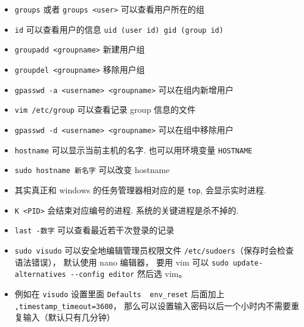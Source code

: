 \begin{itemize}
\item \verb`groups` 或者 \verb`groups <user>` 可以查看用户所在的组
\item \verb`id` 可以查看用户的信息 \verb`uid (user id) gid (group id)`
\item \verb`groupadd <groupname>` 新建用户组
\item \verb`groupdel <groupname>` 移除用户组
\item \verb`gpasswd -a <username> <groupname>` 可以在组内新增用户
\item \verb`vim /etc/group` 可以查看记录 group 信息的文件
\item \verb`gpasswd -d <username> <groupname>` 可以在组中移除用户
\item \verb`hostname` 可以显示当前主机的名字. 也可以用环境变量 \verb|HOSTNAME|
\item \verb|sudo hostname 新名字| 可以改变 hostname
\item 其实真正和 windows 的任务管理器相对应的是 \verb`top`, 会显示实时进程. 
\item \verb`K <PID>` 会结束对应编号的进程. 系统的关键进程是杀不掉的.
\item \verb`last -数字` 可以查看最近若干次登录的记录
\item \verb|sudo visudo| 可以安全地编辑管理员权限文件 \verb|/etc/sudoers|（保存时会检查语法错误）， 默认使用 nano 编辑器， 要用 vim
 可以 \verb|sudo update-alternatives --config editor| 然后选 vim。
\item 例如在 \verb|visudo| 设置里面 \verb|Defaults  env_reset| 后面加上 \verb|,timestamp_timeout=3600|， 那么可以设置输入密码以后一个小时内不需要重复输入（默认只有几分钟）
\end{itemize}

